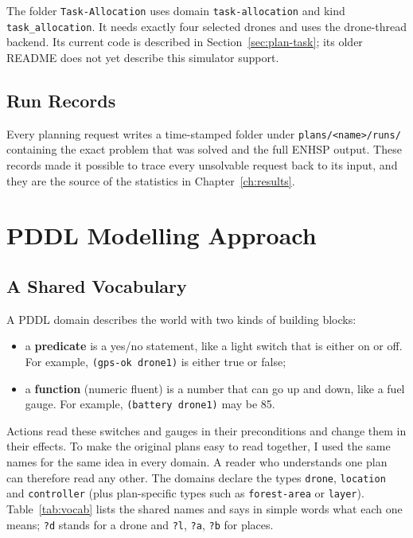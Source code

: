 \documentclass[11pt,a4paper,oneside]{report}
\newcommand{\code}[1]{\texttt{#1}}
\begin{document}
The folder \code{Task-Allocation} uses domain \code{task-allocation} and kind
\code{task\_allocation}. It needs exactly four selected drones and uses the drone-thread backend.
Its current code is described in Section~\ref{sec:plan-task}; its older README does not yet
describe this simulator support.

\section{Run Records}
Every planning request writes a time-stamped folder under \code{plans/<name>/runs/} containing
the exact problem that was solved and the full ENHSP output. These records made it possible to
trace every unsolvable request back to its input, and they are the source of the statistics in
Chapter~\ref{ch:results}.

\chapter{PDDL Modelling Approach}\label{ch:model}

\section{A Shared Vocabulary}
A PDDL domain describes the world with two kinds of building blocks:
\begin{itemize}
  \item a \textbf{predicate} is a yes/no statement, like a light switch that is either on or off.
        For example, \code{(gps-ok drone1)} is either true or false;
  \item a \textbf{function} (numeric fluent) is a number that can go up and down, like a fuel
        gauge. For example, \code{(battery drone1)} may be 85.
\end{itemize}
Actions read these switches and gauges in their preconditions and change them in their effects.
To make the original plans easy to read together, I used the same names for the same idea in every
domain. A reader who understands one plan can therefore read any other. The domains declare the
types \code{drone}, \code{location} and \code{controller} (plus plan-specific types such as
\code{forest-area} or \code{layer}). Table~\ref{tab:vocab} lists the shared names and says in
simple words what each one means; \code{?d} stands for a drone and \code{?l}, \code{?a},
\code{?b} for places.
\end{document}
